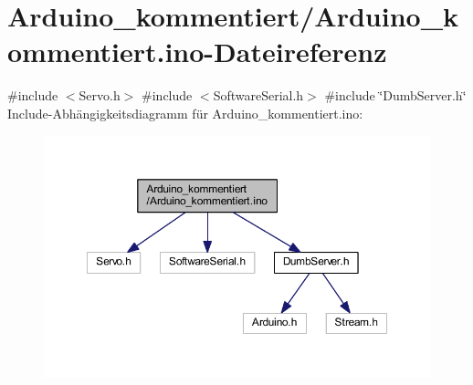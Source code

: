 \hypertarget{_arduino__kommentiert_8ino}{}\section{Arduino\+\_\+kommentiert/\+Arduino\+\_\+kommentiert.ino-\/\+Dateireferenz}
\label{_arduino__kommentiert_8ino}
{\ttfamily \#include $<$Servo.\+h$>$}\newline
{\ttfamily \#include $<$Software\+Serial.\+h$>$}\newline
{\ttfamily \#include \char`\"{}Dumb\+Server.\+h\char`\"{}}\newline
Include-\/\+Abhängigkeitsdiagramm für Arduino\+\_\+kommentiert.\+ino\+:\nopagebreak
\begin{figure}[H]
\begin{center}
\leavevmode
\includegraphics[width=350pt]{_arduino__kommentiert_8ino__incl}
\end{center}
\end{figure}
